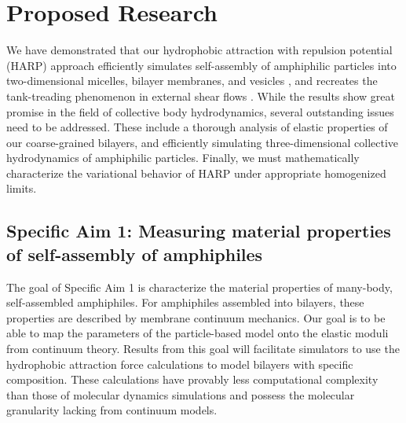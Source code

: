 \section{Proposed Research}
\label{sec:proposed-work}
We have demonstrated that our hydrophobic attraction with repulsion potential (HARP) approach efficiently simulates
self-assembly of amphiphilic particles into two-dimensional micelles, bilayer membranes, and vesicles \cite{Fu2018_SIAM}, and
recreates the tank-treading phenomenon in external shear flows
\cite{Fu20}.
%
While the results show great promise in the field of collective body hydrodynamics,
several outstanding issues need to be addressed. These include a thorough 
analysis of elastic properties of our coarse-grained bilayers, and 
efficiently simulating three-dimensional collective hydrodynamics of amphiphilic particles.
Finally, we must mathematically characterize the variational behavior of HARP under appropriate homogenized limits.

\subsection{Specific Aim 1: Measuring material properties of self-assembly of amphiphiles}
\label{subsec:specific_aim_1}

The goal of Specific Aim 1 is characterize the material properties of many-body, self-assembled amphiphiles.
For amphiphiles assembled into bilayers, these properties are described by membrane continuum mechanics.
Our goal is to be able to map the parameters of the particle-based model onto the elastic moduli from continuum theory.
Results from this goal will facilitate simulators to use the hydrophobic attraction force calculations
to model bilayers with specific composition. These calculations have provably less computational complexity than
those of molecular dynamics simulations and possess the molecular granularity lacking from continuum models.

